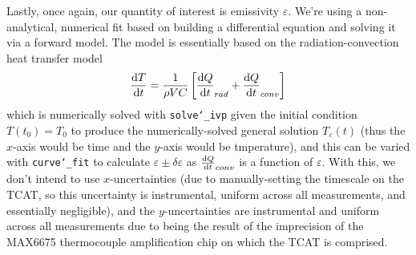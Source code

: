 \documentclass[12pt]{article}
\begin{document}
Lastly, once again, our quantity of interest is emissivity $\varepsilon$. We're using a non-analytical, numerical fit based on building a differential equation and solving it via a forward model. The model is essentially based on the radiation-convection heat transfer model
\begin{equation}
  \dv{T}{t} = \frac{1}{\rho V C} \left[ \dv{Q}{t}_{rad} + \dv{Q}{t}_{conv} \right] 
\end{equation}
which is numerically solved with \texttt{solve\char`_ivp} given the initial condition $T(t_0) = T_0$ to produce the numerically-solved general solution $T_\varepsilon(t)$ (thus the $x$-axis would be time and the $y$-axis would be tmperature), and this can be varied with \texttt{curve\char`_fit} to calculate $\varepsilon \pm \delta\varepsilon$ as $\dv{Q}{t}_{conv}$ is a function of $\varepsilon$. With this, we don't intend to use $x$-uncertainties (due to manually-setting the timescale on the TCAT, so this uncertainty is instrumental, uniform across all measurements, and essentially negligible), and the $y$-uncertainties are instrumental and uniform across all measurements due to being the result of the imprecision of the MAX6675 thermocouple amplification chip on which the TCAT is comprised. 
\end{document}
